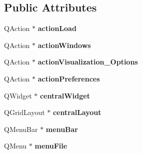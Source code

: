 \subsection*{Public Attributes}
\begin{DoxyCompactItemize}
\item 
Q\+Action $\ast$ {\bfseries action\+Load}\hypertarget{class_ui___lots_of_lines_app_class_ac97798c51294047c272e1324ef33f9cc}{}\label{class_ui___lots_of_lines_app_class_ac97798c51294047c272e1324ef33f9cc}

\item 
Q\+Action $\ast$ {\bfseries action\+Windows}\hypertarget{class_ui___lots_of_lines_app_class_a798683f007bef85c52e27119e944a929}{}\label{class_ui___lots_of_lines_app_class_a798683f007bef85c52e27119e944a929}

\item 
Q\+Action $\ast$ {\bfseries action\+Visualization\+\_\+\+Options}\hypertarget{class_ui___lots_of_lines_app_class_aad8bfc8c7aede4c0aa8ed6047b989049}{}\label{class_ui___lots_of_lines_app_class_aad8bfc8c7aede4c0aa8ed6047b989049}

\item 
Q\+Action $\ast$ {\bfseries action\+Preferences}\hypertarget{class_ui___lots_of_lines_app_class_a75ef9939a78c24fbfca21829e7f155ea}{}\label{class_ui___lots_of_lines_app_class_a75ef9939a78c24fbfca21829e7f155ea}

\item 
Q\+Widget $\ast$ {\bfseries central\+Widget}\hypertarget{class_ui___lots_of_lines_app_class_a98725710eb52017e347d69ec91c9694e}{}\label{class_ui___lots_of_lines_app_class_a98725710eb52017e347d69ec91c9694e}

\item 
Q\+Grid\+Layout $\ast$ {\bfseries central\+Layout}\hypertarget{class_ui___lots_of_lines_app_class_ae881122b0181b6a1b68b0849c414c1cc}{}\label{class_ui___lots_of_lines_app_class_ae881122b0181b6a1b68b0849c414c1cc}

\item 
Q\+Menu\+Bar $\ast$ {\bfseries menu\+Bar}\hypertarget{class_ui___lots_of_lines_app_class_a3cdb6de1827e1c193c45574312cd2bfa}{}\label{class_ui___lots_of_lines_app_class_a3cdb6de1827e1c193c45574312cd2bfa}

\item 
Q\+Menu $\ast$ {\bfseries menu\+File}\hypertarget{class_ui___lots_of_lines_app_class_a6d0d769a036628da791dcd6d9840fe42}{}\label{class_ui___lots_of_lines_app_class_a6d0d769a036628da791dcd6d9840fe42}


\end{DoxyCompactItemize}
